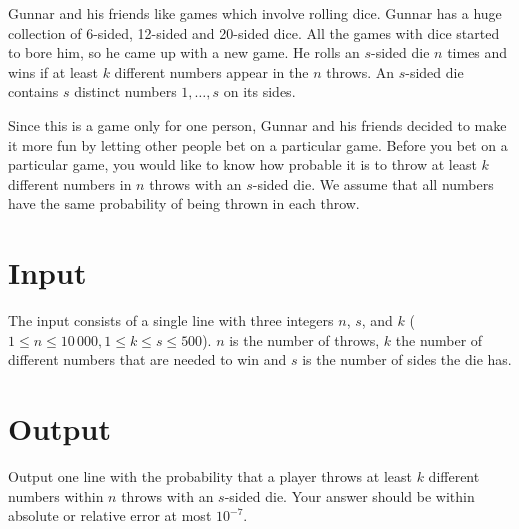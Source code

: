 Gunnar and his friends like games which involve rolling dice. Gunnar has a huge collection of
6-sided, 12-sided and 20-sided dice. All the games with dice started to bore him, so he came up
with a new game. He rolls an $s$-sided die $n$ times and wins if at least $k$ different numbers
appear in the $n$ throws. An $s$-sided die contains $s$ distinct numbers $1, \dots, s$ on its
sides.

Since this is a game only for one person, Gunnar and his friends decided to make it more fun by
letting other people bet on a particular game. Before you bet on a particular game, you would
like to know how probable it is to throw at least $k$ different numbers in $n$ throws with an
$s$-sided die. We assume that all numbers have the same probability of being thrown in each throw.


\section*{Input}
The input consists of a single line with three integers $n$, $s$, and $k$ ($1\le n\le 10\,000, 1 \le k \le s \le 500$).
$n$ is the number of throws, $k$ the number of different numbers that are needed to win and $s$ is the
number of sides the die has.

\section*{Output}
Output one line with the probability that a player throws at least $k$ different numbers within $n$
throws with an $s$-sided die. Your answer should be within absolute or relative error at most
$10^{-7}$.
